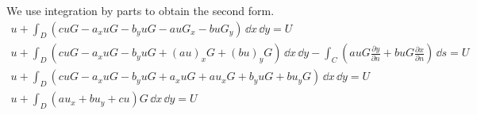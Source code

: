 \begin{Solution}
  We use integration by parts to obtain the second form.
  \begin{gather*}
    u + \int_D ( c u G - a_x u G - b_y u G  - a u G_x - b u G_y ) \,\dd x \,\dd y = U\\
    u + \int_D ( c u G - a_x u G - b_y u G  + (a u)_x G + (b u)_y G ) \,\dd x \,\dd y 
    - \int_C \left(a u G \frac{\partial y}{\partial n} + b u G \frac{\partial x}{\partial n} \right)\,\dd s
    = U \\
    u + \int_D ( c u G - a_x u G - b_y u G  + a_x u G + a u_x G 
    + b_y u G + b u_y G ) \,\dd x \,\dd y = U \\
    \boxed{
      u + \int_D ( a u_x + b u_y + c u ) G \,\dd x \,\dd y = U 
      }
  \end{gather*}
\end{Solution}



